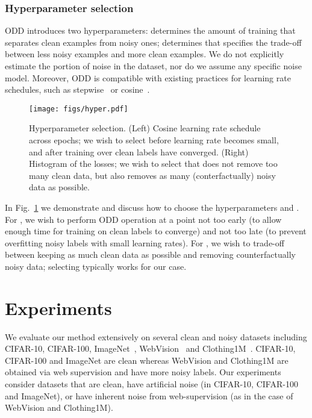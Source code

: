 \documentclass[a4paper,11pt]{article}
\begin{document}
\subsubsection{Hyperparameter selection} \textsc{ODD} introduces two hyperparameters:  determines the amount of training that separates clean examples from noisy ones;  determines  that specifies the trade-off between less noisy examples and more clean examples. We do not explicitly estimate the portion of noise in the dataset, nor do we assume any specific noise model. Moreover, \textsc{ODD} is compatible with existing practices for learning rate schedules, such as stepwise~\cite{he2015deep} or cosine~\cite{loshchilov2016sgdr}.

\begin{figure}
    \centering
    \texttt{[image: figs/hyper.pdf]}
    \caption{Hyperparameter selection. (Left) Cosine learning rate schedule across epochs; we wish to select  before learning rate becomes small, and after training over clean labels have converged. (Right) Histogram of the losses; we wish to select  that does not remove too many clean data, but also removes as many (conterfactually) noisy data as possible.}
    \label{fig:hyper}
\end{figure}

In Fig.~\ref{fig:hyper} we demonstrate and discuss how to choose the hyperparameters  and . For , we wish to perform ODD operation at a point not too early (to allow enough time for training on clean labels to converge) and not too late (to prevent overfitting noisy labels with small learning rates). For , we wish to trade-off between keeping as much clean data as possible and removing counterfactually noisy data; selecting  typically works for our case. \section{Experiments}
\label{sec:experiments}
We evaluate our method extensively on several clean and noisy datasets including CIFAR-10, CIFAR-100,  ImageNet~\cite{russakovsky2015imagenet}, WebVision~\cite{li2017webvision} and Clothing1M~\cite{xiao2015learning}. CIFAR-10, CIFAR-100 and ImageNet are clean whereas WebVision and Clothing1M are obtained via web supervision and have more noisy labels. Our experiments consider datasets that are clean, have artificial noise (in CIFAR-10, CIFAR-100 and ImageNet), or have inherent noise from web-supervision (as in the case of WebVision and Clothing1M). 
\end{document}
